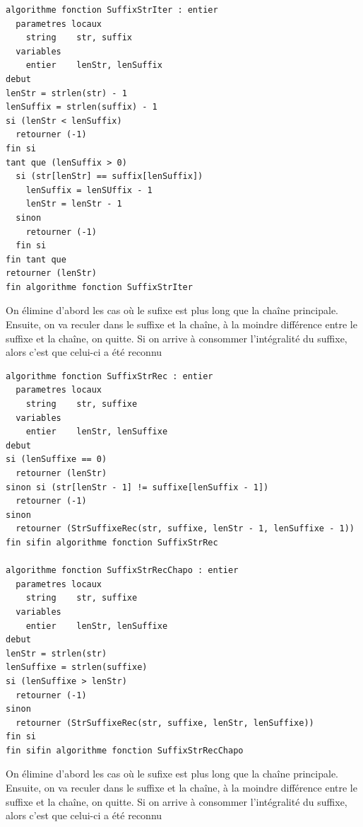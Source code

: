 \documentclass[11pt,a4paper]{article}
\begin{document}
\vfillLast


\newpage

\vfillFirst



\begin{table}[ht!]
  \centering
\begin{lstlisting}[style=algorithmique]
algorithme fonction SuffixStrIter : entier
  parametres locaux
    string    str, suffix
  variables
    entier    lenStr, lenSuffix
debut
lenStr = strlen(str) - 1
lenSuffix = strlen(suffix) - 1
si (lenStr < lenSuffix)
  retourner (-1)
fin si
tant que (lenSuffix > 0)
  si (str[lenStr] == suffix[lenSuffix])
    lenSuffix = lenSUffix - 1
    lenStr = lenStr - 1
  sinon
    retourner (-1)
  fin si
fin tant que
retourner (lenStr)
fin algorithme fonction SuffixStrIter \end{lstlisting}
  \caption{On élimine d'abord les cas où le sufixe est plus long que la chaîne principale. Ensuite, on va reculer dans le suffixe et la chaîne, à la moindre différence entre le suffixe et la chaîne, on quitte. Si on arrive à consommer l'intégralité du suffixe, alors c'est que celui-ci a été reconnu }
\end{table}


\vfillLast

\clearpage

\vfillFirst


\begin{table}[ht!]
  \centering
\begin{lstlisting}[style=algorithmique]
algorithme fonction SuffixStrRec : entier
  parametres locaux
    string    str, suffixe
  variables
    entier    lenStr, lenSuffixe
debut
si (lenSuffixe == 0)
  retourner (lenStr)
sinon si (str[lenStr - 1] != suffixe[lenSuffix - 1])
  retourner (-1)
sinon
  retourner (StrSuffixeRec(str, suffixe, lenStr - 1, lenSuffixe - 1))
fin sifin algorithme fonction SuffixStrRec

algorithme fonction SuffixStrRecChapo : entier
  parametres locaux
    string    str, suffixe
  variables
    entier    lenStr, lenSuffixe
debut
lenStr = strlen(str)
lenSuffixe = strlen(suffixe)
si (lenSuffixe > lenStr)
  retourner (-1)
sinon
  retourner (StrSuffixeRec(str, suffixe, lenStr, lenSuffixe))
fin si
fin sifin algorithme fonction SuffixStrRecChapo \end{lstlisting}
  \caption{On élimine d'abord les cas où le sufixe est plus long que la chaîne principale. Ensuite, on va reculer dans le suffixe et la chaîne, à la moindre différence entre le suffixe et la chaîne, on quitte. Si on arrive à consommer l'intégralité du suffixe, alors c'est que celui-ci a été reconnu }
\end{table}
\end{document}

